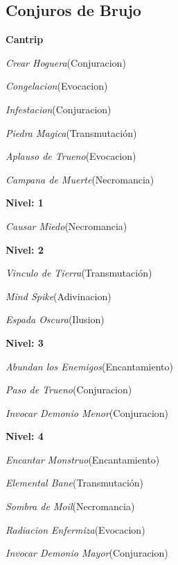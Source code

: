 \documentclass[a4paper,twocolumn,openany,10pt]{dndbook}
\begin{document}
\subsection*{Conjuros de Brujo}
\begin{list}{}{}
	\item \textbf{Cantrip}
	\begin{list}{}{}
		\item \textit{Crear Hoguera}(Conjuracion)
		\item \textit{Congelacion}(Evocacion)
		\item \textit{Infestacion}(Conjuracion)
		\item \textit{Piedra Magica}(Transmutación)
		\item \textit{Aplauso de Trueno}(Evocacion)
		\item \textit{Campana de Muerte}(Necromancia)
	\end{list}

	\item \textbf{Nivel: 1}
	\begin{list}{}{}
		\item \textit{Causar Miedo}(Necromancia)
	\end{list}

	\item \textbf{Nivel: 2}
	\begin{list}{}{}
		\item \textit{Vinculo de Tierra}(Transmutación)
		\item \textit{Mind Spike}(Adivinacion)
		\item \textit{Espada Oscura}(Ilusion)
	\end{list}

	\item \textbf{Nivel: 3}
	\begin{list}{}{}
		\item \textit{Abundan los Enemigos}(Encantamiento)
		\item \textit{Paso de Trueno}(Conjuracion)
		\item \textit{Invocar Demonio Menor}(Conjuracion)
	\end{list}

	\item \textbf{Nivel: 4}
	\begin{list}{}{}
		\item \textit{Encantar Monstruo}(Encantamiento)
		\item \textit{Elemental Bane}(Transmutación)
		\item \textit{Sombra de Moil}(Necromancia)
		\item \textit{Radiacion Enfermiza}(Evocacion)
		\item \textit{Invocar Demonio Mayor}(Conjuracion)
	\end{list}


\end{list}
\end{document}
